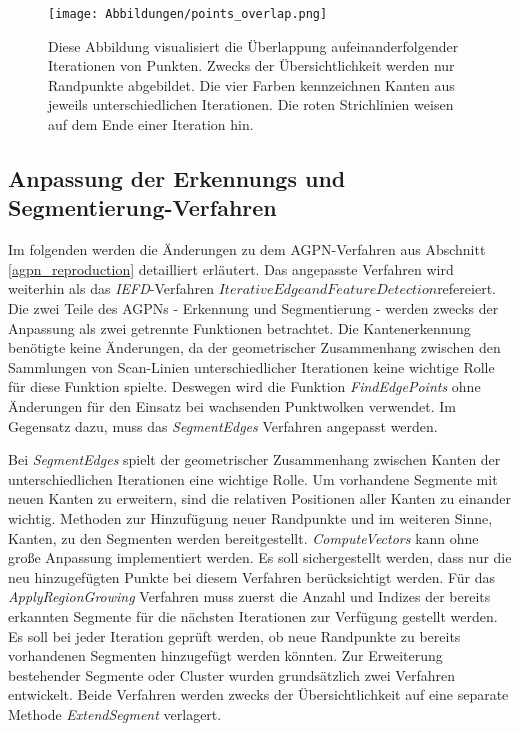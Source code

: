 \begin{figure}[t]
	\texttt{[image: Abbildungen/points\_overlap.png]}
	\centering
	\caption{Diese Abbildung visualisiert die Überlappung aufeinanderfolgender Iterationen von Punkten. Zwecks der Übersichtlichkeit werden nur Randpunkte abgebildet. Die vier Farben kennzeichnen Kanten aus jeweils unterschiedlichen Iterationen. Die roten Strichlinien weisen auf dem Ende einer Iteration hin.}
	\label{fig: point_overlap}
\end{figure}

\subsection{Anpassung der Erkennungs und Segmentierung-Verfahren}
Im folgenden werden die Änderungen zu dem AGPN-Verfahren aus Abschnitt \ref{agpn_reproduction} detailliert erläutert. Das angepasste Verfahren wird weiterhin als das \textit{IEFD}-Verfahren \textit{\(Iterative Edge and Feature Detection\)}refereiert. Die zwei Teile des AGPNs - Erkennung und Segmentierung - werden zwecks der Anpassung als zwei getrennte Funktionen betrachtet. Die Kantenerkennung benötigte keine Änderungen, da der geometrischer Zusammenhang zwischen den Sammlungen von Scan-Linien unterschiedlicher Iterationen keine wichtige Rolle für diese Funktion spielte. Deswegen wird die Funktion \textit{FindEdgePoints} ohne Änderungen für den Einsatz bei wachsenden Punktwolken verwendet. Im Gegensatz dazu, muss das \textit{SegmentEdges} Verfahren angepasst werden.

Bei \textit{SegmentEdges} spielt der geometrischer Zusammenhang zwischen Kanten der unterschiedlichen Iterationen eine wichtige Rolle. Um vorhandene Segmente mit neuen Kanten zu erweitern, sind die relativen Positionen aller Kanten zu einander wichtig. Methoden zur Hinzufügung neuer Randpunkte und im weiteren Sinne, Kanten, zu den Segmenten werden bereitgestellt. \textit{ComputeVectors} kann ohne große Anpassung implementiert werden. Es soll sichergestellt werden, dass nur die neu hinzugefügten Punkte bei diesem Verfahren berücksichtigt werden. Für das \textit{ApplyRegionGrowing} Verfahren muss zuerst die Anzahl und Indizes der bereits erkannten Segmente für die nächsten Iterationen zur Verfügung gestellt werden. Es soll bei jeder Iteration geprüft werden, ob neue Randpunkte zu bereits vorhandenen Segmenten hinzugefügt werden könnten. Zur Erweiterung bestehender Segmente oder Cluster wurden grundsätzlich zwei Verfahren entwickelt. Beide Verfahren werden zwecks der Übersichtlichkeit auf eine separate Methode \textit{ExtendSegment} verlagert.

